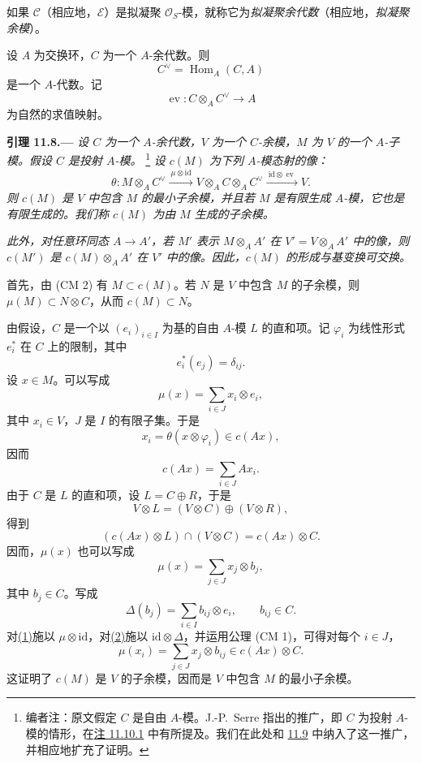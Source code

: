 如果 \(\mathcal C\)\textup{（相应地，\(\mathcal E\)）}是拟凝聚 \(\mathcal O_S\)-模，就称它为\emph{拟凝聚余代数}\textup{（相应地，\emph{拟凝聚余模}）}。

设 \(A\) 为交换环，\(C\) 为一个 \(A\)-余代数。则
\[
  C^\vee=\operatorname{Hom}_A(C,A)
\]
是一个 \(A\)-代数。记
\[
  \operatorname{ev}:C\otimes_A C^\vee\longrightarrow A
\]
为自然的求值映射。

\medskip
{}\label{lem:sga3-VIB-11.8}%
\noindent\textbf{引理 11.8.---}
\emph{设 \(C\) 为一个 \(A\)-余代数，\(V\) 为一个 \(C\)-余模，\(M\) 为 \(V\) 的一个 \(A\)-子模。假设 \(C\) 是投射 \(A\)-模。}%
\footnote{\label{note:sga3-VIB-113}编者注：原文假定 \(C\) 是自由 \(A\)-模。J.-P.\ Serre 指出的推广，即 \(C\) 为投射 \(A\)-模的情形，在\hyperref[rem:sga3-VIB-11.10.1]{注 11.10.1} 中有所提及。我们在此处和 \hyperref[prop:sga3-VIB-11.9]{11.9} 中纳入了这一推广，并相应地扩充了证明。}
\emph{设 \(c(M)\) 为下列 \(A\)-模态射的像：}
\label{form:sga3-VIB-11.8-theta}%
\[
  \theta:
  M\otimes_A C^\vee
  \xrightarrow{\ \mu\otimes\mathrm{id}\ }
  V\otimes_A C\otimes_A C^\vee
  \xrightarrow{\ \mathrm{id}\otimes\operatorname{ev}\ }
  V.
\]
\emph{则 \(c(M)\) 是 \(V\) 中包含 \(M\) 的最小子余模，并且若 \(M\) 是有限生成 \(A\)-模，它也是有限生成的。我们称 \(c(M)\) 为\emph{由 \(M\) 生成的子余模}。}

\emph{此外，对任意环同态 \(A\to A'\)，若 \(M'\) 表示 \(M\otimes_AA'\) 在 \(V'=V\otimes_AA'\) 中的像，则 \(c(M')\) 是 \(c(M)\otimes_AA'\) 在 \(V'\) 中的像。因此，\(c(M)\) 的形成与基变换可交换。}

首先，由 \textup{(CM 2)} 有 \(M\subset c(M)\)。若 \(N\) 是 \(V\) 中包含 \(M\) 的子余模，则 \(\mu(M)\subset N\otimes C\)，从而 \(c(M)\subset N\)。

由假设，\(C\) 是一个以 \((e_i)_{i\in I}\) 为基的自由 \(A\)-模 \(L\) 的直和项。记 \(\varphi_i\) 为线性形式 \(e_i^*\) 在 \(C\) 上的限制，其中
\[
  e_i^*(e_j)=\delta_{ij}.
\]
设 \(x\in M\)。可以写成
\label{form:sga3-VIB-11.8-eq1}%
\[
  \tag{1}
  \mu(x)=\sum_{i\in J}x_i\otimes e_i,
\]
其中 \(x_i\in V\)，\(J\) 是 \(I\) 的有限子集。于是
\[
  x_i=\theta(x\otimes\varphi_i)\in c(Ax),
\]
因而
\[
  c(Ax)=\sum_{i\in J}Ax_i.
\]
由于 \(C\) 是 \(L\) 的直和项，设 \(L=C\oplus R\)，于是
\[
  V\otimes L=(V\otimes C)\oplus(V\otimes R),
\]
得到
\label{form:sga3-VIB-11.8-intersection}%
\[
  (c(Ax)\otimes L)\cap(V\otimes C)=c(Ax)\otimes C.
\]
因而，\(\mu(x)\) 也可以写成
\label{form:sga3-VIB-11.8-eq2}%
\[
  \tag{2}
  \mu(x)=\sum_{j\in J}x_j\otimes b_j,
\]
其中 \(b_j\in C\)。写成
\[
  \Delta(b_j)=\sum_{i\in I}b_{ij}\otimes e_i,
  \qquad b_{ij}\in C.
\]
对\hyperref[form:sga3-VIB-11.8-eq1]{\textup{(1)}}施以 \(\mu\otimes\mathrm{id}\)，对\hyperref[form:sga3-VIB-11.8-eq2]{\textup{(2)}}施以 \(\mathrm{id}\otimes\Delta\)，并运用公理 \textup{(CM 1)}，可得对每个 \(i\in J\)，
\label{form:sga3-VIB-11.8-coaction-generators}%
\[
  \mu(x_i)=\sum_{j\in J}x_j\otimes b_{ij}
    \in c(Ax)\otimes C.
\]
这证明了 \(c(M)\) 是 \(V\) 的子余模，因而是 \(V\) 中包含 \(M\) 的最小子余模。


